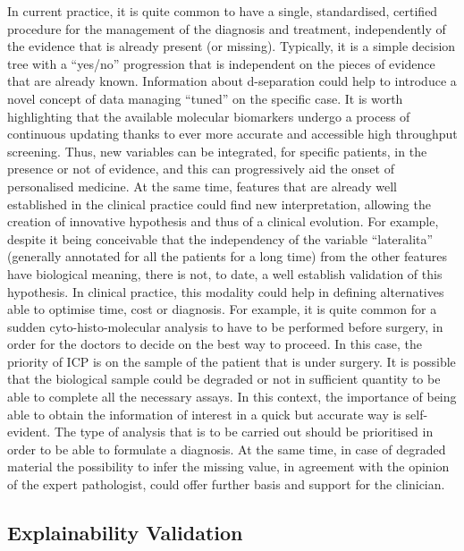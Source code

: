 In current practice, it is quite common to have a single, standardised, certified procedure for the management of the diagnosis and treatment, independently of the evidence that is already present (or missing). 
Typically, it is a simple decision tree with a \enquote{yes/no} progression that is independent on the pieces of evidence that are already known. 
Information about d-separation could help to introduce a novel concept of data managing \enquote{tuned} on the specific case.
It is worth highlighting that the available molecular biomarkers undergo a process of continuous updating thanks to ever more accurate and accessible high throughput screening. 
Thus, new variables can be integrated, for specific patients, in the presence or not of evidence, and this can progressively aid the onset of personalised medicine. 
At the same time, features that are already well established in the clinical practice could find new interpretation, allowing the creation of innovative hypothesis and thus of a clinical evolution. 
For example, despite it being conceivable that the independency of the variable \enquote{lateralita} (generally annotated for all the patients for a long time) from the other features have biological meaning, there is not, to date, a well establish validation of this hypothesis. 
In clinical practice, this modality could help in defining alternatives able to optimise time, cost or diagnosis. 
For example, it is quite common for a sudden cyto-histo-molecular analysis to have to be performed before surgery, in order for the doctors to decide on the best way to proceed.
 In this case, the priority of ICP is on the sample of the patient that is under surgery. 
 It is possible that the biological sample could be degraded or not in sufficient quantity to be able to complete all the necessary assays. 
 In this context, the importance of being able to obtain the information of interest in a quick but accurate way is self-evident.
The type of analysis that is to be carried out should be prioritised in order to be able to formulate a diagnosis.
At the same time, in case of degraded material the possibility to infer the missing value, in agreement with the opinion of the expert pathologist, could offer further basis and support for the clinician.

\subsection{Explainability Validation}



